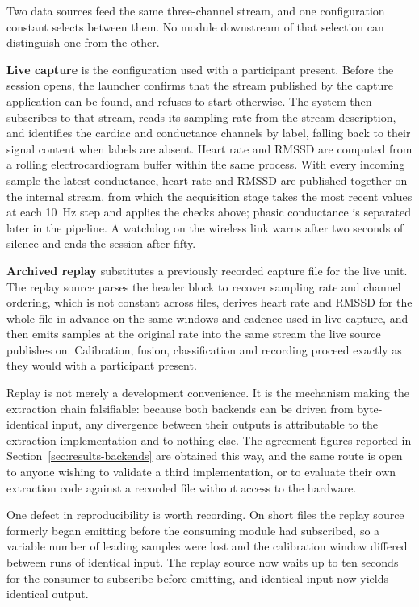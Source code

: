 Two data sources feed the same three-channel stream, and one
configuration constant selects between them. No module downstream
of that selection can distinguish one from the other.

\textbf{Live capture} is the configuration used with a
participant present. Before the session opens, the launcher
confirms that the stream published by the capture application can
be found, and refuses to start otherwise. The system then
subscribes to that stream, reads its sampling rate from the stream
description, and identifies the cardiac and conductance channels by
label, falling back to their signal content when labels are absent.
Heart rate and RMSSD are computed from a rolling electrocardiogram
buffer within the same process. With every incoming sample the
latest conductance, heart rate and RMSSD are published together on
the internal stream, from which the acquisition stage takes the
most recent values at each 10~Hz step and applies the checks above;
phasic conductance is separated later in the pipeline. A watchdog
on the wireless link warns after two seconds of silence and ends
the session after fifty.

\textbf{Archived replay} substitutes a previously recorded
capture file for the live unit. The replay source parses the
header block to recover sampling rate and channel ordering, which
is not constant across files, derives heart rate and RMSSD for
the whole file in advance on the same windows and cadence used in
live capture, and then emits samples at the original rate into the
same stream the live source publishes on. Calibration, fusion,
classification and recording proceed exactly as they would with a
participant present.

Replay is not merely a development convenience. It is the
mechanism making the extraction chain falsifiable: because both
backends can be driven from byte-identical input, any divergence
between their outputs is attributable to the extraction
implementation and to nothing else. The agreement figures
reported in Section~\ref{sec:results-backends} are obtained this way, and
the same route is open to anyone wishing to validate a third
implementation, or to evaluate their own extraction code against
a recorded file without access to the hardware.

One defect in reproducibility is worth recording. On short files
the replay source formerly began emitting before the consuming
module had subscribed, so a variable number of leading samples
were lost and the calibration window differed between runs of
identical input. The replay source now waits up to ten seconds
for the consumer to subscribe before emitting, and identical input
now yields identical output.

